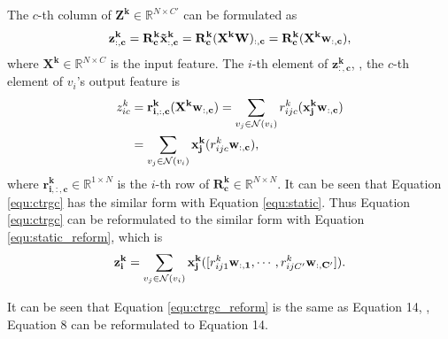 \documentclass[10pt,twocolumn,letterpaper]{article}
\begin{document}
The $c$-th column of $\mathbf{Z^k}\in \mathbb{R}^{N\times C'}$ can be formulated as
\vspace{-0.16cm}
\begin{equation}
\vspace{-0.16cm}
\mathbf{z^k_{:,c}}=\mathbf{R^k_{c}\tilde{x}^k_{:,c}}=\mathbf{R^k_c}\mathbf{(X^kW)_{:,c}}=\mathbf{R^k_c}\mathbf{(X^kw_{:,c})},
\end{equation}
where $\mathbf{X^k}\in \mathbb{R}^{N\times C}$ is the input feature. The $i$-th element of $\mathbf{z^k_{:,c}}$, \ie, the $c$-th element of $v_i$'s output feature is
\begin{align}
z^k_{ic}&=\mathbf{r^k_{i,:,c}}\mathbf{(X^kw_{:,c})}=\sum_{v_j \in \mathcal{N}(v_i)}r^k_{ijc}\mathbf{(x^k_jw_{:,c})} \notag\\
&=\sum_{v_j \in \mathcal{N}(v_i)}\mathbf{x^k_j}(r^k_{ijc}\mathbf{w_{:,c}}),
\label{equ:ctrgc}
\end{align}
where $\mathbf{r^k_{i,:,c}}\in \mathbb{R}^{1\times N}$ is the $i$-th row of $\mathbf{R^k_c}\in \mathbb{R}^{N\times N}$. It can be seen that Equation \ref{equ:ctrgc} has the similar form with Equation \ref{equ:static}. Thus Equation \ref{equ:ctrgc} can be reformulated to the similar form with Equation \ref{equ:static_reform}, which is
\vspace{-0.16cm}
\begin{equation}
\vspace{-0.16cm}
\mathbf{z^k_i}=\sum_{v_j \in \mathcal{N}(v_i)}\mathbf{x^k_j}([r^k_{ij1}\mathbf{w_{:,1}},\cdots, r^k_{ijC'}\mathbf{w_{:,C'}}]).
\label{equ:ctrgc_reform}
\end{equation}

It can be seen that Equation \ref{equ:ctrgc_reform} is the same as Equation {\color{blue}14}, \ie, Equation {\color{blue}8} can be reformulated to Equation {\color{blue}14}.
\end{document}
